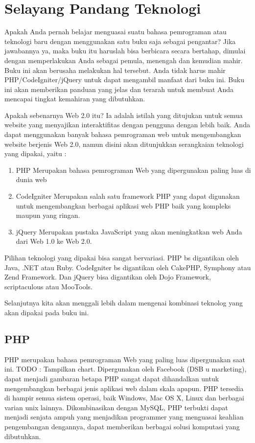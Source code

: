 
\chapter{Selayang Pandang Teknologi}
Apakah Anda pernah belajar menguasai suatu bahasa pemrograman atau teknologi baru dengan menggunakan satu buku saja sebagai pengantar? Jika jawabannya ya, maka buku itu haruslah bisa berbicara secara bertahap, dimulai dengan memperlakukan Anda sebagai pemula, menengah dan kemudian mahir. Buku ini akan berusaha melakukan hal tersebut. Anda tidak harus mahir PHP/CodeIgniter/jQuery untuk dapat mengambil manfaat dari buku ini. Buku ini akan memberikan panduan yang jelas dan terarah untuk membuat Anda mencapai tingkat kemahiran yang dibutuhkan.

Apakah sebenarnya Web 2.0 itu? Ia adalah istilah yang ditujukan untuk semua website yang menyajikan interaktifitas dengan pengguna dengan lebih baik. Anda dapat menggunakan banyak bahasa pemrograman web untuk mengembangkan website berjenis Web 2.0, namun disini akan ditunjukkan serangkaian teknologi yang dipakai, yaitu :
\begin{enumerate}
\item PHP
  Merupakan bahasa pemrograman Web yang dipergunakan paling luas di dunia web
\item CodeIgniter
  Merupakan salah satu framework PHP yang dapat digunakan untuk mengembangkan berbagai aplikasi web PHP baik yang kompleks maupun yang ringan.
\item jQuery
  Merupakan pustaka JavaScript yang akan meningkatkan web Anda dari Web 1.0 ke Web 2.0.
\end{enumerate}

Pilihan teknologi yang dipakai bisa sangat bervariasi. PHP bs digantikan oleh Java, .NET atau Ruby. CodeIgniter bs digantikan oleh CakePHP, Symphony atau Zend Framework. Dan jQuery bisa digantikan oleh Dojo Framework, scriptaculous atau MooTools. 

Selanjutnya kita akan menggali lebih dalam mengenai kombinasi teknolog yang akan dipakai pada buku ini.
\section{PHP}
PHP merupakan bahasa pemrograman Web yang paling luas dipergunakan saat ini. TODO : Tampilkan chart. Dipergunakan oleh Facebook (DSB u marketing), dapat menjadi gambaran betapa PHP sangat dapat dihandalkan untuk mengembangkan berbagai jenis aplikasi web dalam skala apapun. PHP tersedia di hampir semua sistem operasi, baik Windows, Mac OS X, Linux dan berbagai varian unix lainnya. Dikombinasikan dengan MySQL, PHP terbukti dapat menjadi senjata ampuh yang menjadikan programmer yang menguasai keahlian pengembangan dengannya, dapat memberikan berbagai solusi komputasi yang dibutuhkan.
